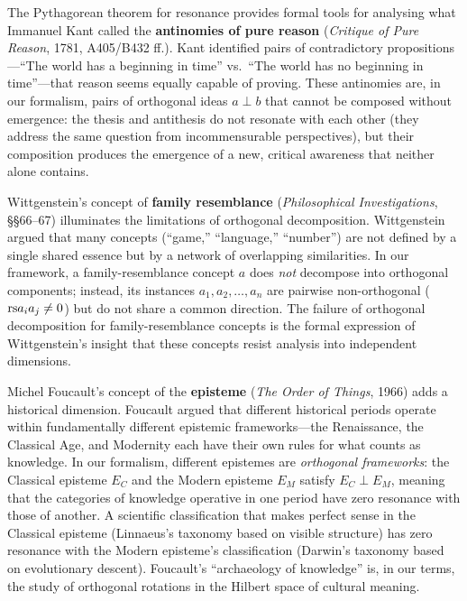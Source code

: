 \begin{interpretation}
\label{interp:ch12:kant_antinomies}
The Pythagorean theorem for resonance provides formal tools for analysing
what Immanuel Kant called the \textbf{antinomies of pure reason} (\emph{Critique
of Pure Reason}, 1781, A405/B432 ff.).  Kant identified pairs of
contradictory propositions---``The world has a beginning in time'' vs.\ ``The
world has no beginning in time''---that reason seems equally capable of
proving.  These antinomies are, in our formalism, pairs of orthogonal ideas
$a \perp b$ that cannot be composed without emergence: the thesis and
antithesis do not resonate with each other (they address the same question
from incommensurable perspectives), but their composition produces the
emergence of a new, critical awareness that neither alone contains.

Wittgenstein's concept of \textbf{family resemblance}
(\emph{Philosophical Investigations}, \S\S66--67) illuminates the
limitations of orthogonal decomposition.  Wittgenstein argued that many
concepts (``game,'' ``language,'' ``number'') are not defined by a single
shared essence but by a network of overlapping similarities.  In our
framework, a family-resemblance concept $a$ does \emph{not} decompose into
orthogonal components; instead, its instances $a_1, a_2, \ldots, a_n$ are
pairwise non-orthogonal ($\mathrm{rs}{a_i}{a_j} \neq 0$) but do not share a common
direction.  The failure of orthogonal decomposition for family-resemblance
concepts is the formal expression of Wittgenstein's insight that these
concepts resist analysis into independent dimensions.

Michel Foucault's concept of the \textbf{episteme} (\emph{The Order of
Things}, 1966) adds a historical dimension.  Foucault argued that different
historical periods operate within fundamentally different epistemic
frameworks---the Renaissance, the Classical Age, and Modernity each have
their own rules for what counts as knowledge.  In our formalism, different
epistemes are \emph{orthogonal frameworks}: the Classical episteme $E_C$ and
the Modern episteme $E_M$ satisfy $E_C \perp E_M$, meaning that the
categories of knowledge operative in one period have zero resonance with
those of another.  A scientific classification that makes perfect sense in
the Classical episteme (Linnaeus's taxonomy based on visible structure) has
zero resonance with the Modern episteme's classification (Darwin's taxonomy
based on evolutionary descent).  Foucault's ``archaeology of knowledge'' is,
in our terms, the study of orthogonal rotations in the Hilbert space of
cultural meaning.
\end{interpretation}



